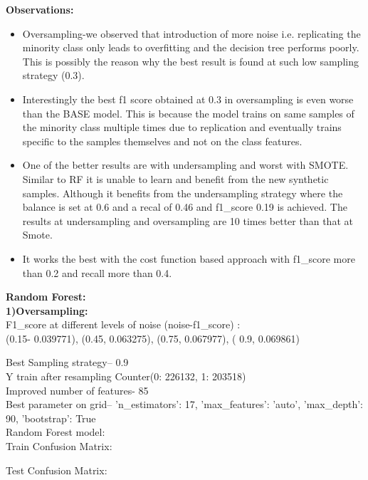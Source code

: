 \documentclass[fleqn,10pt]{SelfArx} %
\begin{document}
\begin{itemize}
\textbf{Observations:}
\begin{itemize}
	\item Oversampling-we observed that introduction of more noise i.e. replicating the minority class only leads to overfitting and the decision tree performs poorly. This is possibly the reason why the best result is found at such low sampling strategy (0.3). 
	\item Interestingly the best f1 score obtained at 0.3 in oversampling is even worse than the BASE model. This is because the model trains on same samples of the minority class multiple times due to replication and eventually trains specific to the samples themselves and not on the class features.
	\item One of the better results are with undersampling and worst with SMOTE. Similar to RF it is unable to learn and benefit from the new synthetic samples. Although it benefits from the undersampling strategy where the balance is set at 0.6 and a recal of 0.46 and f1_score 0.19 is achieved. The results at undersampling and oversampling are 10 times better than that at Smote.
	\item It works the best with the cost function based approach with f1_score more than 0.2 and recall more than 0.4.
\end{itemize}

\bigbreak
\noindent
\textbf{	Random Forest:}\\
\newline
\noindent
\textbf{1)Oversampling:}\\
\newline
\noindent
F1_score at different levels of noise (noise-f1_score) :\\
(0.15- 0.039771), (0.45, 0.063275), (0.75, 0.067977), ( 0.9, 0.069861)


\noindent
Best Sampling strategy-- 0.9\\
\newline
Y train after resampling Counter({0: 226132, 1: 203518})\\
Improved number of features- 85\\
Best parameter on grid-- {'n_estimators': 17, 'max_features': 'auto', 'max_depth': 90, 'bootstrap': True}\\
Random Forest model:\\
\bigbreak
\noindent
Train Confusion Matrix:


\bigbreak
\noindent
	Test Confusion Matrix:
	

\end{itemize}
\end{document}
